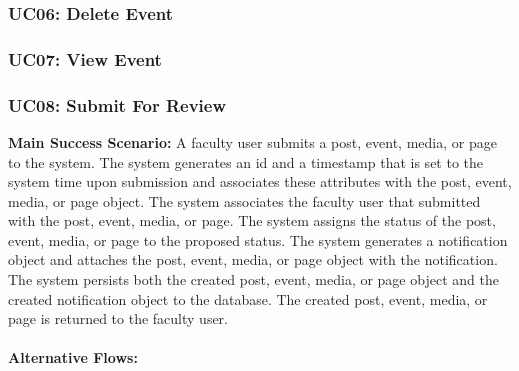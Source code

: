 \documentclass{article}
\begin{document}
\subsubsection{UC06: Delete Event}

\subsubsection{UC07: View Event}

\subsubsection{UC08: Submit For Review}
\textbf{Main Success Scenario:} A faculty user submits a post, event, media, or page to the system. The system generates an id and a timestamp that is set to the system time upon submission and associates these attributes with the post, event, media, or page object. The system associates the faculty user that submitted with the post, event, media, or page. The system assigns the status of the post, event, media, or page to the proposed status. The system generates a notification object and attaches the post, event, media, or page object with the notification. The system persists both the created post, event, media, or page object and the created notification object to the database. The created post, event, media, or page is returned to the faculty user. \\
\\
\textbf{Alternative Flows:}
\end{document}
